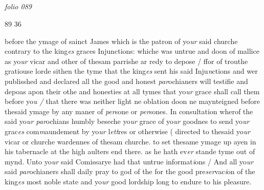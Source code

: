 \documentclass[12pt, a4paper]{book}
\begin{document}
\dotfill
					  \subsection*{}  \subsection*{}

\textit{folio 089}


\begin{flushright}{\color{Mahogany}89} 36\end{flushright}
	
		
			
		
				\marginpar[\vspace{0.5cm}{\textcolor{Gray}{n}}]{}
			
		
		\ifthenelse{\isodd{\thepage}}
		{\reversemarginpar}
		{\normalmarginpar}
		 before the ymage of sainct James which is the patron
 of yo\textit{ur }said churche contrary to the king\textit{es} graces
 Injunctions: whiche was untrue and doon of mallice
 as yo\textit{ur} vicar and other of thesam parrishe ar
 redy to depose / ffor of trouthe gratiouse lorde sithen
 the tyme that the king\textit{es} sent his said Inju\textit{n}ctions
 and wer publisshed and declared all the good and
 honest \textit{par}ochianers will testifie and depoas apon their
 othe and honesties at all tymes that yo\textit{ur} grace
 shall call them before yo\textit{u /} that there was neither
 light ne oblation doon ne maynteigned before thesaid
  ymage by any maner of \textit{per}sone or \textit{per}sones. In
 consultation wherof the said yo\textit{ur par}ochians humbly
			beseche yo\textit{ur} grace of yo\textit{ur} goodnes to send yo\textit{ur} grac\textit{es}
 com\textit{m}aundement by yo\textit{ur} l\textit{ett}res or otherwise ( directed
 to thesaid yo\textit{ur} vicar or churche wardennes of thesam
 churche. to set thesame ymage up ayen in his
 tabernacle at the high aulters end there.
 as he hath ev\textit{er} stande tyme out of mynd. Unto yo\textit{ur} said
 Comissarye had that untrue informat\textit{i}ons / And
 all yo\textit{ur} said \textit{par}ochianers shall daily pray to god
 of the for the good pre\textit{ser}vac\textit{i}on of the king\textit{es} most
			noble state and yo\textit{ur} good lordship long to
 endure to his pleasure.
	
\end{document}
